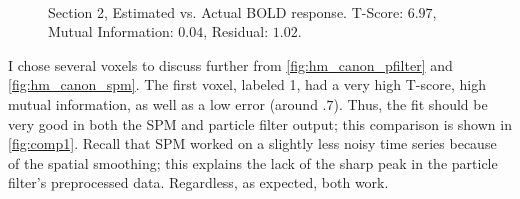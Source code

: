 \begin{figure}
\\
\caption{Section 2, Estimated vs. Actual BOLD response. T-Score: $6.97$, Mutual Information: $0.04$, Residual: $1.02$.}
\label{fig:comp2}
\end{figure}

I chose several voxels to discuss further from \autoref{fig:hm_canon_pfilter} and \autoref{fig:hm_canon_spm}.
The first voxel, labeled 1, had a very high T-score, high mutual information,  as well as 
a low error (around $.7$). Thus, the
fit should be very good in both the SPM and particle filter output; this comparison is shown in 
\autoref{fig:comp1}. Recall that SPM worked on a slightly less noisy time series because of the
spatial smoothing; this explains the lack of the sharp peak in the particle filter's preprocessed
data. Regardless, as expected, both work. 

